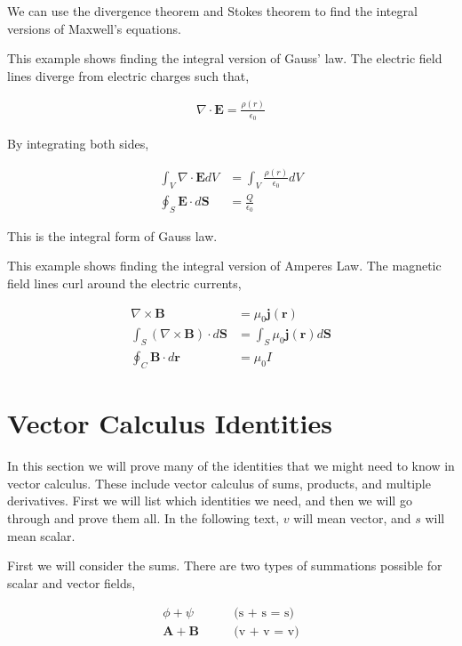 \documentclass[11pt]{amsart}
\begin{document}
We can use the divergence theorem and Stokes theorem to find the integral versions of Maxwell's equations.

This example shows finding the integral version of Gauss' law. The electric field lines diverge from electric charges such that,

\begin{align*}
  \nabla \cdot \mathbf{E} = \frac{\rho(r)}{\epsilon_0}
\end{align*}

By integrating both sides,

\begin{align*}
  \int_V \nabla \cdot \mathbf{E} dV &= \int_V \frac{\rho(r)}{\epsilon_0} dV \\
  \oint_S \mathbf{E} \cdot d\mathbf{S} &= \frac{Q}{\epsilon_0}
\end{align*}

This is the integral form of Gauss law.

This example shows finding the integral version of Amperes Law. The magnetic field lines curl around the electric currents,

\begin{align*}
  \nabla \times \mathbf{B} &= \mu_0 \mathbf{j}(\mathbf{r}) \\
  \int_S \left(\nabla \times \mathbf{B}\right) \cdot d\mathbf{S} &= \int_S \mu_0 \mathbf{j}(\mathbf{r}) d\mathbf{S} \\
  \oint_C \mathbf{B} \cdot d\mathbf{r} &= \mu_0 I
\end{align*}

\section{Vector Calculus Identities}

In this section we will prove many of the identities that we might need to know in vector calculus. These include vector calculus of sums, products, and multiple derivatives. First we will list which identities we need, and then we will go through and prove them all. In the following text, $v$ will mean vector, and $s$ will mean scalar.

First we will consider the sums. There are two types of summations possible for scalar and vector fields,

\begin{align*}
  \phi + \psi \qquad &\text{(s + s = s)} \\
  \mathbf{A} + \mathbf{B} \qquad &\text{(v + v = v)}
\end{align*}
\end{document}
